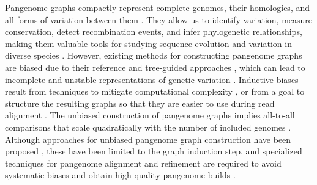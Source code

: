 \documentclass[pdflatex,mathphys]{jnl}%
\theoremstyle{thmstyleone}%
\theoremstyle{thmstyletwo}%
\theoremstyle{thmstylethree}%
\begin{document}



\maketitle

Pangenome graphs compactly represent complete genomes, their homologies, and all forms of variation between them \cite{Garrison_2018,Paten_2017,Garrison_2019,Eizenga2020}.
They allow us to identify variation, measure conservation, detect recombination events, and infer phylogenetic relationships, making them valuable tools for studying sequence evolution and variation in diverse species \cite{Armstrong2020,Guarracino_odgi_2022}.
However, existing methods for constructing pangenome graphs \cite{Li2020,Hickey_2023} are biased due to their reference and tree-guided approaches \cite{Armstrong2020,Noll_2022}, which can lead to incomplete and unstable representations of genetic variation \cite{Garrison_seqwish_2022}.
Inductive biases result from techniques to mitigate computational complexity \cite{Li2020,Armstrong2020}, or from a goal to structure the resulting graphs so that they are easier to use during read alignment \cite{Hickey_2023}.
The unbiased construction of pangenome graphs implies all-to-all comparisons that scale quadratically with the number of included genomes \cite{Garrison_seqwish_2022}.
Although approaches for unbiased pangenome graph construction have been proposed \cite{Minkin_2016,Garrison_seqwish_2022}, these have been limited to the graph induction step, and specialized techniques for pangenome alignment and refinement are required to avoid systematic biases and obtain high-quality pangenome builds \cite{Liao_2023}.
\end{document}
